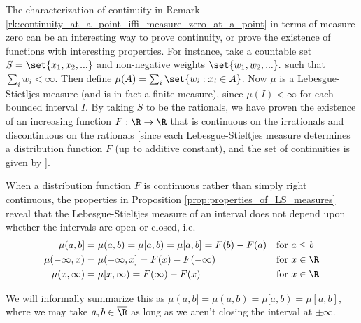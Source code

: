 \documentclass{article} %
\begin{document}
\begin{remark}
The characterization of continuity in Remark \ref{rk:continuity_at_a_point_iffi_measure_zero_at_a_point} in terms of measure zero can be an interesting way to prove continuity, or prove the existence of functions with interesting properties.   For instance, take a countable set $S = \set{x_1, x_2, ...}$ and non-negative weights $\set{w_1, w_2, ...}.$ such that $\sum_i w_i < \infty$.   Then define $\mu(A) = \sum_{i} \set{w_i : x_i \in A}$.  Now $\mu$ is a Lebesgue-Stietljes measure (and is in fact a finite measure), since $\mu(I) < \infty$ for each bounded interval $I$. By taking $S$ to be the rationals, we have proven the existence of an increasing function $F : \R \to \R$ that is continuous on the irrationals and discontinuous on the rationals {\footnotesize [since each Lebesgue-Stieltjes measure determines a distribution function $F$ (up to additive constant), and the set of continuities is given by ]}.
\end{remark}

\begin{remark}{}
When a distribution function $F$ is continuous rather than simply right continuous, the properties in Proposition \ref{prop:properties_of_LS_measures} reveal that the Lebesgue-Stieltjes measure of an interval does not depend upon whether the intervals are open or closed, i.e. 
\begin{subequations}
\begin{align}
\mu(a,b] &= \mu(a,b) = \mu[a,b) = \mu[a,b] = F(b)-F(a) &&  \text{for } a \leq b \\
\mu(-\infty,x) &= \mu(-\infty,x] = F(x) - F(-\infty) && \text{for } x \in \R  \\
\mu(x,\infty) &= \mu[x,\infty) = F(\infty) - F(x) && \text{for } x \in \R  
\end{align}
\label{eqn:LS_measures_with_continuous_distribution_function_dont_care_about_intervals_being_open_or_closed}
\end{subequations}

We will informally summarize this as $\mu(a,b]=\mu(a,b)=\mu[a,b)=\mu[a,b]$, where we may take $a,b \in \overline{\R}$ as long as we aren't closing the interval at $\pm \infty$.
\label{rk:LS_measures_with_continuous_distribution_function_agnostic_to_open_vs_closed_intervals}
\end{remark}
\end{document}
